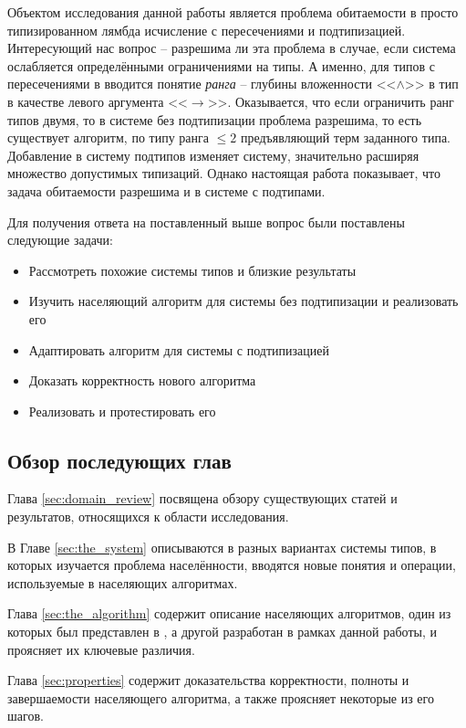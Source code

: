 \documentclass[../main.tex]{subfiles}
\begin{document}
\emptyline

Объектом исследования данной работы является проблема обитаемости в просто типизированном лямбда исчисление с пересечениями и подтипизацией. Интересующий нас вопрос -- разрешима ли эта проблема в случае, если система ослабляется определёнными ограничениями на типы. А именно, для типов с пересечениями в \cite{leivant_1983} вводится понятие {\it ранга} -- глубины вложенности <<$\wedge$>> в тип в качестве левого аргумента <<$\to$>>. Оказывается, что если ограничить ранг типов двумя, то в системе без подтипизации проблема разрешима, то есть существует алгоритм, по типу ранга $\leqslant 2$ предъявляющий терм заданного типа. Добавление в систему подтипов изменяет систему, значительно расширяя множество допустимых типизаций. Однако настоящая работа показывает, что задача обитаемости разрешима и в системе с подтипами.

Для получения ответа на поставленный выше вопрос были поставлены следующие задачи: 
\begin{itemize}
    \item Рассмотреть похожие системы типов и близкие результаты
    \item Изучить населяющий алгоритм для системы без подтипизации и реализовать его
    \item Адаптировать алгоритм для системы с подтипизацией
    \item Доказать корректность нового алгоритма
    \item Реализовать и протестировать его
    
\end{itemize}

\subsection*{Обзор последующих глав}
Глава \ref{sec:domain_review} посвящена обзору существующих статей и результатов, относящихся к области исследования. 

В Главе \ref{sec:the_system} описываются в разных вариантах системы типов, в которых изучается проблема населённости, вводятся новые понятия и операции, используемые в населяющих алгоритмах.

Глава \ref{sec:the_algorithm} содержит описание населяющих алгоритмов, один из которых был представлен в \cite{kusmierek_2007}, а другой разработан в рамках данной работы, и проясняет их ключевые различия.

Глава \ref{sec:properties} содержит доказательства корректности, полноты и завершаемости населяющего алгоритма, а также проясняет некоторые из его шагов. 
\end{document}
